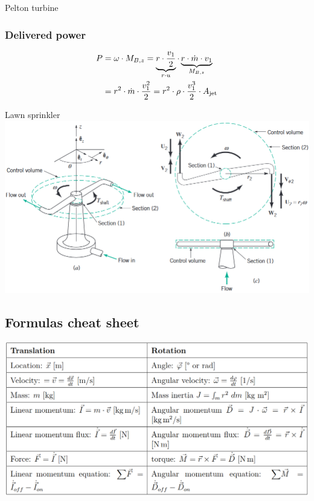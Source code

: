\documentclass{article}
\begin{document}
\begin{multicols}{2}
\begin{examplebox}{Pelton turbine}
    \subsubsection{Delivered power}
    \begin{align}
        P&=\omega\cdot M_{B,z} = \underbrace{r\cdot \frac{v_1}{2}}_{r\cdot u}\cdot \underbrace{r\cdot\dot{m}\cdot v_1}_{M_{B,z}} \notag \\
        &= r^2\cdot\dot{m}\cdot\frac{v_1^2}{2} = r^2\cdot \rho \cdot \frac{v_1^3}{2}\cdot A_{\rm jet}
    \end{align}
\end{examplebox}

\begin{examplebox}{Lawn sprinkler}
    \includegraphics[width=\textwidth]{media/rasensprenger_orig.png}
    
\end{examplebox}

\subsection{Formulas cheat sheet}
\includegraphics[width=\columnwidth]{media/angular_formulas.png}







\end{multicols}
\end{document}
